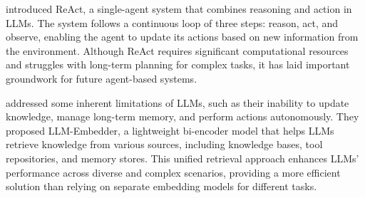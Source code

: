\documentclass[runningheads]{llncs}
\begin{document}
\citeauthor{Yao2022ReActSR} \cite{Yao2022ReActSR} introduced ReAct, a single-agent system that combines reasoning and action in LLMs. The system follows a continuous loop of three steps: reason, act, and observe, enabling the agent to update its actions based on new information from the environment. Although ReAct requires significant computational resources and struggles with long-term planning for complex tasks, it has laid important groundwork for future agent-based systems.


\citeauthor{DBLP:journals/corr/abs-2310-07554} \cite{DBLP:journals/corr/abs-2310-07554} addressed some inherent limitations of LLMs, such as their inability to update knowledge, manage long-term memory, and perform actions autonomously. They proposed LLM-Embedder, a lightweight bi-encoder model that helps LLMs retrieve knowledge from various sources, including knowledge bases, tool repositories, and memory stores. This unified retrieval approach enhances LLMs' performance across diverse and complex scenarios, providing a more efficient solution than relying on separate embedding models for different tasks.
\end{document}
